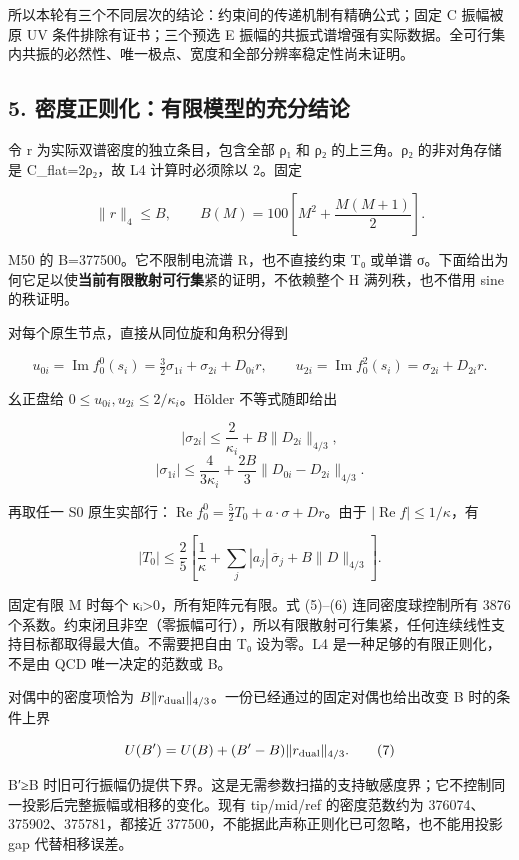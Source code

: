 \documentclass[
  11pt,
  a4paper,
]{article}
\begin{document}
所以本轮有三个不同层次的结论：约束间的传递机制有精确公式；固定 C
振幅被原 UV 条件排除有证书；三个预选 E
振幅的共振式谱增强有实际数据。全可行集内共振的必然性、唯一极点、宽度和全部分辨率稳定性尚未证明。

\subsection{5.
密度正则化：有限模型的充分结论}\label{ux5bc6ux5ea6ux6b63ux5219ux5316ux6709ux9650ux6a21ux578bux7684ux5145ux5206ux7ed3ux8bba}

令 r 为实际双谱密度的独立条目，包含全部 ρ₁ 和 ρ₂ 的上三角。ρ₂
的非对角存储是 C\_flat=2ρ₂，故 L4 计算时必须除以 2。固定

\[
\|r\|_4\le B,\qquad B(M)=100\left[M^2+\frac{M(M+1)}2\right].
\]

M50 的 B=377500。它不限制电流谱 R，也不直接约束 T₀ 或单谱
σ。下面给出为何它足以使\textbf{当前有限散射可行集}紧的证明，不依赖整个 H
满列秩，也不借用 sine 的秩证明。

对每个原生节点，直接从同位旋和角积分得到

\[
u_{0i}=\operatorname{Im}f^0_0(s_i)=\tfrac32\sigma_{1i}+\sigma_{2i}+D_{0i}r,
\qquad u_{2i}=\operatorname{Im}f^2_0(s_i)=\sigma_{2i}+D_{2i}r.
\]

幺正盘给 \(0\le u_{0i},u_{2i}\le2/\kappa_i\)。Hölder 不等式随即给出

\[
|\sigma_{2i}|\le\frac2{\kappa_i}+B\|D_{2i}\|_{4/3},
\] \[
|\sigma_{1i}|\le\frac4{3\kappa_i}+\frac{2B}3\|D_{0i}-D_{2i}\|_{4/3}.
\tag{5}
\]

再取任一 S0
原生实部行：\(\operatorname{Re}f^0_0=\tfrac52 T_0+a\cdot\sigma+Dr\)。由于
\(|\operatorname{Re}f|\le1/\kappa\)，有

\[
|T_0|\le\frac25\left[\frac1\kappa+\sum_j|a_j|\,\overline\sigma_j+B\|D\|_{4/3}\right].
\tag{6}
\]

固定有限 M 时每个 κᵢ\textgreater0，所有矩阵元有限。式 (5)--(6)
连同密度球控制所有 3876
个系数。约束闭且非空（零振幅可行），所以有限散射可行集紧，任何连续线性支持目标都取得最大值。不需要把自由
T₀ 设为零。L4 是一种足够的有限正则化，不是由 QCD 唯一决定的范数或 B。

对偶中的密度项恰为
\(B\|r_{\rm dual}\|_{4/3}\)。一份已经通过的固定对偶也给出改变 B
时的条件上界

\[
U(B')=U(B)+(B'-B)\|r_{\rm dual}\|_{4/3}.
\tag{7}
\]

B′≥B
时旧可行振幅仍提供下界。这是无需参数扫描的支持敏感度界；它不控制同一投影后完整振幅或相移的变化。现有
tip/mid/ref 的密度范数约为 376074、375902、375781，都接近
377500，不能据此声称正则化已可忽略，也不能用投影 gap 代替相移误差。
\end{document}
